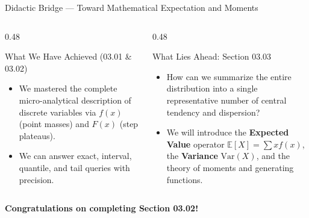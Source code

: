 \documentclass[aspectratio=169,xcolor={dvipsnames,table}]{beamer}
\begin{document}
\begin{frame}{Didactic Bridge --- Toward Mathematical Expectation and Moments}
	\begin{columns}[T]
		\begin{column}{0.48\textwidth}
			\begin{block}{What We Have Achieved (03.01 \& 03.02)}
				\small
				\begin{itemize}
					\itemsep=0.06cm
					\item We mastered the complete micro-analytical description of discrete variables via $f(x)$ (point masses) and $F(x)$ (step plateaus).
					\item We can answer exact, interval, quantile, and tail queries with precision.
				\end{itemize}
			\end{block}
		\end{column}
		\begin{column}{0.48\textwidth}
			\begin{block}{What Lies Ahead: Section 03.03}
				\small
				\begin{itemize}
					\itemsep=0.06cm
					\item How can we summarize the entire distribution into a single representative number of central tendency and dispersion?
					\item We will introduce the \textbf{Expected Value} operator $\mathbb{E}[X] = \sum x f(x)$, the \textbf{Variance} $\text{Var}(X)$, and the theory of moments and generating functions.
				\end{itemize}
			\end{block}
		\end{column}
	\end{columns}
	\vspace{0.2cm}
	\begin{center}
		\textbf{\textcolor{TecAzul}{\Large Congratulations on completing Section 03.02!}}
	\end{center}
\end{frame}
\end{document}

